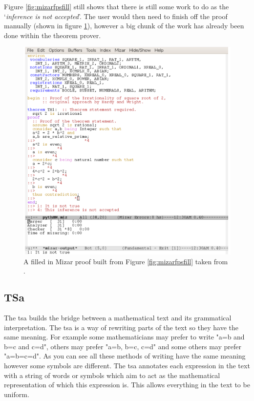 Figure \ref{fig:mizarfpsfill} still shows that there is still some work to do as the `\emph{inference is not accepted}'. The user would then need to finish off the proof manually (shown in figure \ref{fig:mizarfpsfinished}), however a big chunk of the work has already been done within the theorem prover.

\begin{figure}[H]
\begin{center}
\includegraphics[scale=0.7]{Figures/Background/mizarskelfinished.png}
\end{center}
\caption{A filled in Mizar proof built from Figure \ref{fig:mizarfpsfill} taken from \cite{krzysztofphd}. \label{fig:mizarfpsfinished}}
\end{figure}

\subsection{TSa}
\label{subsec:tsa}

The \gls{tsa} builds the bridge between a mathematical text and its grammatical interpretation. The \gls{tsa} is a way of rewriting parts of the text so they have the same meaning. For example some mathematicians may prefer to write "a=b and b=c and c=d", others may prefer "a=b, b=c, c=d" and some others may prefer "a=b=c=d". As you can see all these methods of writing have the same meaning however some symbols are different. The \gls{tsa} annotates each expression in the text with a string of words or symbols which aim to act as the mathematical representation of which this expression is. This allows everything in the text to be uniform.

